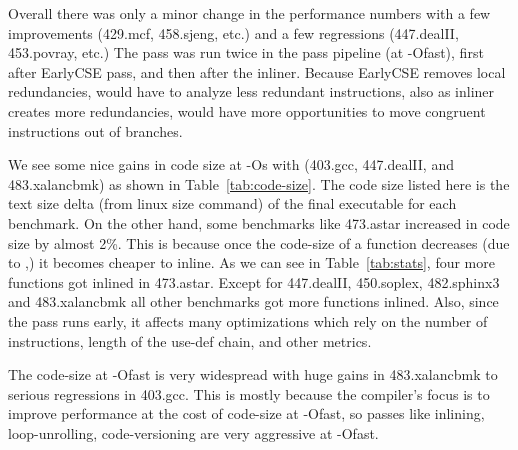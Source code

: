 \documentclass[acmlarge,review,anonymous]{acmart}\settopmatter{printfolios=true}
\begin{document}
Overall there was only a minor change in the performance numbers with a few improvements 
(429.mcf, 458.sjeng, etc.) and a few regressions (447.dealII, 453.povray,
etc.) The \gcm{} pass was run twice in the pass pipeline (at -Ofast),
first after EarlyCSE pass, and then after the inliner. Because EarlyCSE removes
local redundancies, \GCM{} would have to analyze less redundant instructions, also
as inliner creates more redundancies, \GCM{} would have more opportunities to move
congruent instructions out of branches.

We see some nice gains in code size at -Os with \gcm{} (403.gcc, 447.dealII, and
483.xalancbmk) as shown in Table~\ref{tab:code-size}.  The code size listed here
is the text size delta (from linux size command) of the final executable for
each benchmark.  On the other hand, some benchmarks like 473.astar increased in
code size by almost 2\%. This is because once the code-size of a function
decreases (due to \GCM{},) it becomes cheaper to inline. As we can see in
Table~\ref{tab:stats}, four more functions got inlined in 473.astar. Except for
447.dealII, 450.soplex, 482.sphinx3 and 483.xalancbmk all other benchmarks got
more functions inlined. Also, since the pass runs early, it affects many
optimizations which rely on the number of instructions, length of the use-def
chain, and other metrics.

The code-size at -Ofast is very widespread with huge gains in 483.xalancbmk to
serious regressions in 403.gcc. This is mostly because the compiler's focus is
to improve performance at the cost of code-size at -Ofast, so passes like
inlining, loop-unrolling, code-versioning are very aggressive at -Ofast.
\end{document}
